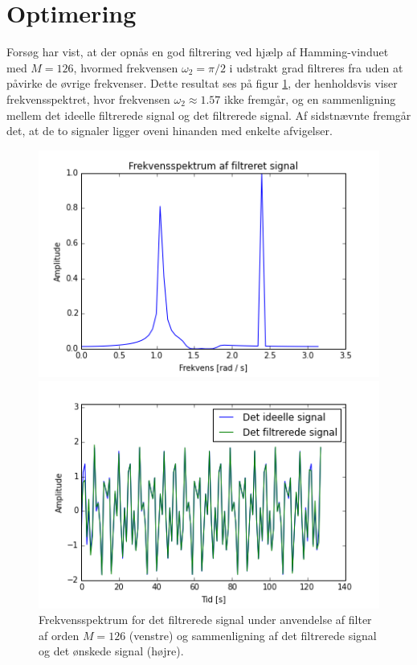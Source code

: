 \section{Optimering}
Forsøg har vist, at der opnås en god filtrering ved hjælp af Hamming-vinduet med $M=126$, hvormed frekvensen $\omega_2 = \pi/2$ i udstrakt grad filtreres fra uden at påvirke de øvrige frekvenser. Dette resultat ses på figur \ref{fig:resultat}, der henholdsvis viser frekvensspektret, hvor frekvensen $\omega_2 \approx 1.57$ ikke fremgår, og en sammenligning mellem det ideelle filtrerede signal og det filtrerede signal. Af sidstnævnte fremgår det, at de to signaler ligger oveni hinanden med enkelte afvigelser.
\begin{figure}[H]
\begin{minipage}{0.49\textwidth}
\centering
\includegraphics[width=\textwidth]{figures/Filter/freq_filt_signal.png}
\end{minipage}
\begin{minipage}{0.49\textwidth}
\centering
\includegraphics[width=\textwidth]{figures/Filter/signal_compare.png}
\end{minipage}
\caption{Frekvensspektrum for det filtrerede signal under anvendelse af filter af orden $M=126$ (venstre) og sammenligning af det filtrerede signal og det ønskede signal (højre).}
\label{fig:resultat}
\end{figure}

